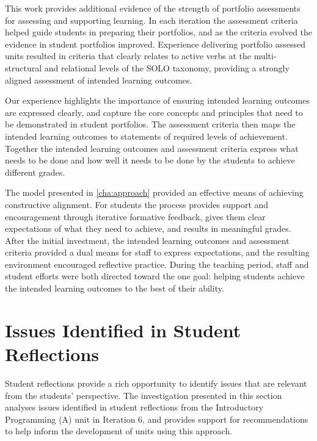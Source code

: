 This work provides additional evidence of the strength of portfolio assessments for assessing and supporting learning. In each iteration the assessment criteria helped guide students in preparing their portfolios, and as the criteria evolved the evidence in student portfolios improved. Experience delivering portfolio assessed units resulted in criteria that clearly relates to active verbs at the multi-structural and relational levels of the SOLO taxonomy, providing a strongly aligned assessment of intended learning outcomes.

Our experience highlights the importance of ensuring intended learning outcomes are expressed clearly, and capture the core concepts and principles that need to be demonstrated in student portfolios. The assessment criteria then maps the intended learning outcomes to statements of required levels of achievement. Together the intended learning outcomes and assessment criteria express what needs to be done and how well it needs to be done by the students to achieve different grades.

The model presented in \cref{cha:approach} provided an effective means of achieving constructive alignment. For students the process provides support and encouragement through iterative formative feedback, gives them clear expectations of what they need to achieve, and results in meaningful grades. After the initial investment, the intended learning outcomes and assessment criteria provided a dual means for staff to express expectations, and the resulting environment encouraged reflective practice. During the teaching period, staff and student efforts were both directed toward the one goal: helping students achieve the intended learning outcomes to the best of their ability.


\clearpage
\section{Issues Identified in Student Reflections} %
\label{sec:issues_identified_in_student_reflections}

Student reflections provide a rich opportunity to identify issues that are relevant from the students' perspective. The investigation presented in this section analyses issues identified in student reflections from the Introductory Programming (A) unit in Iteration 6, and provides support for recommendations to help inform the development of units using this approach. 


